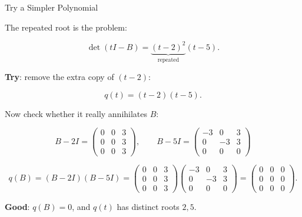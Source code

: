 \documentclass[10pt]{beamer}
\theoremstyle{definition}
\newcommand{\x}[1]{\alert{\textbf{#1}}}
\begin{document}
\begin{frame}[shrink=8]{Try a Simpler Polynomial}

The repeated root is the problem:

$$\det(tI - B) = \underbrace{(t-2)^2}_{\text{repeated}}(t-5).$$

\vfill

\x{Try}: remove the extra copy of $(t-2)$:

$$q(t) = (t-2)(t-5).$$

\vfill

Now check whether it really annihilates $B$:

$$B-2I = \begin{pmatrix}0&0&3\\0&0&3\\0&0&3\end{pmatrix}, \qquad
B-5I = \begin{pmatrix}-3&0&3\\0&-3&3\\0&0&0\end{pmatrix}$$

\vfill

$$q(B) = (B-2I)(B-5I)
= \begin{pmatrix}0&0&3\\0&0&3\\0&0&3\end{pmatrix}
\begin{pmatrix}-3&0&3\\0&-3&3\\0&0&0\end{pmatrix}
= \begin{pmatrix}0&0&0\\0&0&0\\0&0&0\end{pmatrix}.$$

\vfill

\x{Good}: $q(B)=0$, and $q(t)$ has distinct roots $2,5$.

\end{frame}
\end{document}
